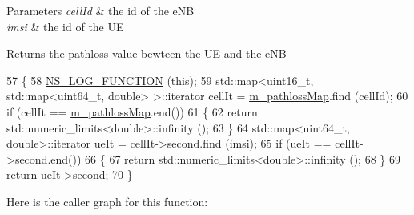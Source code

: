 \begin{DoxyParams}{Parameters}
{\em cell\+Id} & the id of the e\+NB \\
\hline
{\em imsi} & the id of the UE\\
\hline
\end{DoxyParams}
\begin{DoxyReturn}{Returns}
the pathloss value bewteen the UE and the e\+NB 
\end{DoxyReturn}

\begin{DoxyCode}
57 \{
58   \hyperlink{log-macros-disabled_8h_a90b90d5bad1f39cb1b64923ea94c0761}{NS\_LOG\_FUNCTION} (\textcolor{keyword}{this});
59   std::map<uint16\_t, std::map<uint64\_t, double> >::iterator cellIt = 
      \hyperlink{classns3_1_1LteGlobalPathlossDatabase_a3a193fa1babca27aa0a2dfccebf8c0ab}{m\_pathlossMap}.find (cellId);
60   \textcolor{keywordflow}{if} (cellIt == \hyperlink{classns3_1_1LteGlobalPathlossDatabase_a3a193fa1babca27aa0a2dfccebf8c0ab}{m\_pathlossMap}.end())
61     \{
62       \textcolor{keywordflow}{return} std::numeric\_limits<double>::infinity ();
63     \}
64   std::map<uint64\_t, double>::iterator ueIt = cellIt->second.find (imsi);
65   \textcolor{keywordflow}{if} (ueIt ==  cellIt->second.end())
66     \{
67       \textcolor{keywordflow}{return} std::numeric\_limits<double>::infinity ();
68     \}
69   \textcolor{keywordflow}{return} ueIt->second;
70 \}
\end{DoxyCode}


Here is the caller graph for this function\+:



